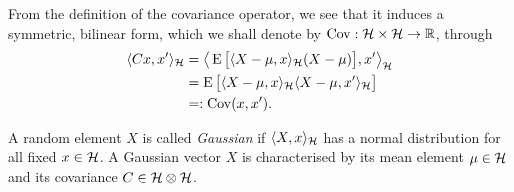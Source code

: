 From the definition of the covariance operator, we see that it induces a symmetric, bilinear form, which we shall denote by $\operatorname{Cov}:{\mathcal H}\times{\mathcal H}\to\mathbb{R}$, through
\begingroup
\setlength{\abovedisplayskip}{8pt}
\setlength{\belowdisplayskip}{6pt}
\begin{align*}
  \langle Cx,x'\rangle_{\mathcal H} 
  &= \big\langle\operatorname{E}\big[\langle X - \mu, x\rangle_{{\mathcal H}}(X - \mu) \big], x' \big\rangle_{\mathcal H} \\
  &= \operatorname{E}\big[\langle X-\mu,x\rangle_{\mathcal H} \langle X-\mu,x'\rangle_{\mathcal H}\big] \\
  &=: \operatorname{Cov}(x,x').
\end{align*}
\endgroup

\begin{definition}
  A random element $X$ is called \emph{Gaussian} if $\langle X,x\rangle_{\mathcal H}$ has a normal distribution for all fixed $x\in{\mathcal H}$.
  A Gaussian vector $X$ is characterised by its mean element $\mu\in{\mathcal H}$ and its covariance $C\in{\mathcal H}\otimes{\mathcal H}$.
\end{definition}
